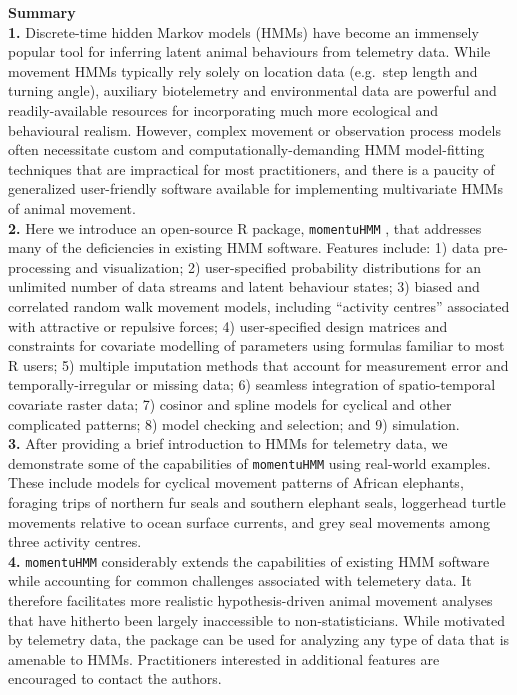 \documentclass[12pt]{article}\usepackage[]{graphicx}\usepackage[]{color}
\begin{document}
\noindent \textbf{Summary}\\
\textbf{1.} Discrete-time hidden Markov models (HMMs) have become an immensely popular tool for inferring latent animal behaviours from telemetry data. While movement HMMs typically rely solely on location data (e.g.\ step length and turning angle), auxiliary biotelemetry and environmental data are powerful and readily-available resources for incorporating much more ecological and behavioural realism. However, complex movement or observation process models often necessitate custom and computationally-demanding HMM model-fitting techniques that are impractical for most practitioners, and there is a paucity of generalized user-friendly software available for implementing multivariate HMMs of animal movement.\\
\textbf{2.} Here we introduce an open-source R package, \verb|momentuHMM|%
, that addresses many of the deficiencies in existing HMM software.  Features include: 1) data pre-processing and visualization; 2) user-specified probability distributions for an unlimited number of data streams and latent behaviour states; %
3) biased and correlated random walk movement models, including ``activity centres'' associated with attractive or repulsive forces; 4) user-specified design matrices and constraints for covariate modelling of parameters using formulas familiar to most R users; 5) multiple imputation methods that account for measurement error and temporally-irregular or missing data; 6) seamless integration of spatio-temporal covariate raster data; 7) cosinor and spline models for cyclical and other complicated patterns; 8) model checking and selection; and 9) simulation.\\%
\textbf{3.} After providing a brief introduction to HMMs for telemetry data, we demonstrate some of the capabilities of \verb|momentuHMM| using real-world examples. These include models for cyclical movement patterns of African elephants, foraging trips of northern fur seals and southern elephant seals, loggerhead turtle movements relative to ocean surface currents, and grey seal movements among three activity centres.\\
\textbf{4.} \verb|momentuHMM| considerably extends the capabilities of existing HMM software while accounting for common challenges associated with telemetery data. It therefore facilitates more realistic hypothesis-driven animal movement analyses that have hitherto been largely inaccessible to non-statisticians.  While motivated by telemetry data, the package can be used for analyzing any type of data that is amenable to HMMs. Practitioners interested in additional features are encouraged to contact the authors.\\
\end{document}
